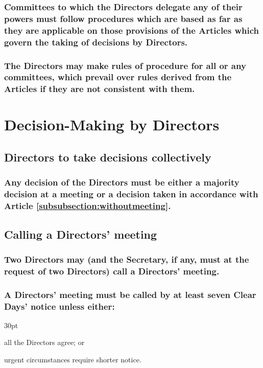 \documentclass[12pt]{article}
\def\clauseindent{30pt}
\newenvironment{subindent}{\begin{adjustwidth}{\clauseindent}{}\begin{hanginglist}}{\end{hanginglist}\end{adjustwidth}}
\begin{document}
\subsubsection{Committees to which the Directors delegate any of their powers must follow procedures which are based as far as they are applicable on those provisions of the Articles which govern the taking of decisions by Directors.}
\subsubsection{The Directors may make rules of procedure for all or any committees, which prevail over rules derived from the Articles if they are not consistent with them.}

\section*{Decision-Making by Directors}

\subsection{Directors to take decisions collectively}
\subsubsection{Any decision of the Directors must be either a majority decision at a meeting or a decision taken in accordance with Article \ref{subsubsection:withoutmeeting}.}

\subsection{Calling a Directors’ meeting}
\subsubsection{Two Directors may (and the Secretary, if any, must at the request of two Directors) call a Directors’ meeting.}
\subsubsection{A Directors’ meeting must be called by at least seven Clear Days’ notice unless either:}
\begin{subindent}
  \item all the Directors agree; or
  \item urgent circumstances require shorter notice.
\end{subindent}
\end{document}
